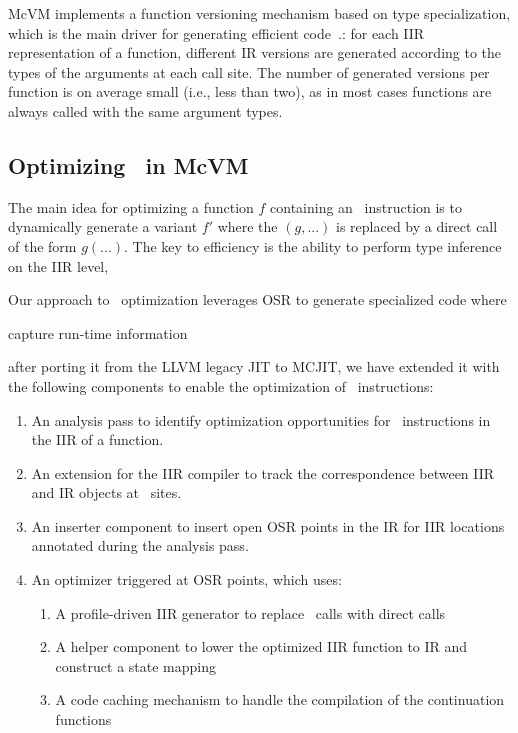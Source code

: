 McVM implements a function versioning mechanism based on type specialization, which is the main driver for generating efficient code~\cite{chevalier2010mcvm}.: for each IIR representation of a function, different IR versions are generated according to the types of the arguments at each call site. 
\ifdefined\fullver 
The number of generated versions per function is on average small (i.e., less than two), as in most cases functions are always called with the same argument types. 
\fi

\subsection{Optimizing \feval\ in McVM}
\label{ss:eval-opt-mcvm}

The main idea for optimizing a function $f$ containing an \feval\ instruction is to dynamically generate a variant $f'$ where the \feval$(g,...)$ is replaced by a direct call of the form $g(...)$. The key to efficiency is the ability to perform type inference on the IIR level, 

Our approach to \feval\ optimization leverages OSR to generate specialized code where 


capture run-time information

after porting it from the LLVM legacy JIT to MCJIT, we have extended it with the following components to enable the optimization of \feval\ instructions:

\begin{enumerate}
\item An analysis pass to identify optimization opportunities for \feval\ instructions in the IIR of a function.
\item An extension for the IIR compiler to track the correspondence between IIR and IR objects at \feval\ sites.
\item An inserter component to insert open OSR points in the IR for IIR locations annotated during the analysis pass.
\item An optimizer triggered at OSR points, which uses:
\begin{enumerate}
\item A profile-driven IIR generator to replace \feval\ calls with direct calls
\item A helper component to lower the optimized IIR function to IR and construct a state mapping 
\item A code caching mechanism to handle the compilation of the continuation functions
\end{enumerate}
\end{enumerate}


